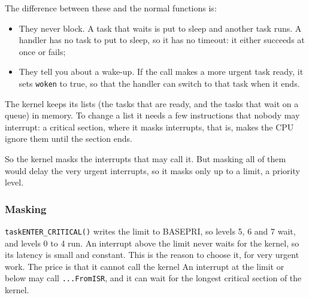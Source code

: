 \documentclass[a4paper,11pt]{article}
\begin{document}
The difference between these and the normal functions is:
\begin{itemize}
	\item They never block. A task that waits is put to sleep and another task runs. A handler has no task to put to sleep, so it has no timeout: it either succeeds at once or fails;	\item They tell you about a wake-up. If the call makes a more urgent task ready, it sets \texttt{woken} to true, so that the handler can switch to that task when it ends.
\end{itemize}

The kernel keeps its lists (the tasks that are ready, and the tasks that wait on a queue) in memory. To change a list it needs a few instructions that nobody may interrupt: a critical section, where it masks interrupts, that is, makes the CPU ignore them until the section ends.

So the kernel masks the interrupts that may call it. But masking all of them would delay the very urgent interrupts, so it
masks only up to a limit, a priority level.

\subsubsection{Masking}

\texttt{taskENTER\_CRITICAL()} writes the limit to BASEPRI, so levels 5, 6 and 7 wait, and levels 0 to 4 run.
An interrupt above the limit never waits for the kernel, so its latency is small and constant. This is the reason to choose it, for very urgent work. The price is that it cannot call the kernel
An interrupt at the limit or below may call \texttt{...FromISR}, and it can wait for the longest critical section of the kernel.
\end{document}
